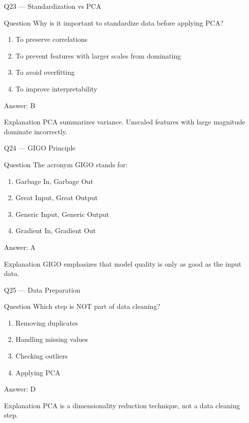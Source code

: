 \documentclass[aspectratio=169,8pt]{beamer}
\begin{document}
	\begin{frame}{Q23 --- Standardization vs PCA}
		\begin{block}{Question}
			Why is it important to standardize data before applying PCA?
		\end{block}
		\begin{enumerate}
			\item To preserve correlations
			\item To prevent features with larger scales from dominating
			\item To avoid overfitting
			\item To improve interpretability
		\end{enumerate}
		\begin{exampleblock}{Answer: B}\end{exampleblock}
		\begin{block}{Explanation}
			PCA summarizes variance. Unscaled features with large magnitude dominate incorrectly.
		\end{block}
	\end{frame}
	
	\begin{frame}{Q24 --- GIGO Principle}
		\begin{block}{Question}
			The acronym GIGO stands for:
		\end{block}
		\begin{enumerate}
			\item Garbage In, Garbage Out
			\item Great Input, Great Output
			\item Generic Input, Generic Output
			\item Gradient In, Gradient Out
		\end{enumerate}
		\begin{exampleblock}{Answer: A}\end{exampleblock}
		\begin{block}{Explanation}
			GIGO emphasizes that model quality is only as good as the input data.
		\end{block}
	\end{frame}
	
	\begin{frame}{Q25 --- Data Preparation}
		\begin{block}{Question}
			Which step is NOT part of data cleaning?
		\end{block}
		\begin{enumerate}
			\item Removing duplicates
			\item Handling missing values
			\item Checking outliers
			\item Applying PCA
		\end{enumerate}
		\begin{exampleblock}{Answer: D}\end{exampleblock}
		\begin{block}{Explanation}
			PCA is a dimensionality reduction technique, not a data cleaning step.
		\end{block}
	\end{frame}
	
\end{document}
